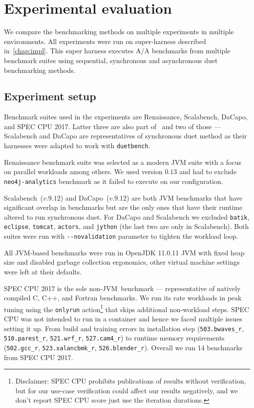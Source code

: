 \chapter{Experimental evaluation}
\label{chap:evaluation}

We compare the benchmarking methods on multiple experiments in multiple environments.
All experiments were run on super-harness described in~\cref{chap:impl}.
This super harness executes A/A benchmarks from multiple benchmark suites using sequential, synchronous and asynchronous duet benchmarking methods.

\section{Experiment setup}
\label{sec:experiment_setup}

Benchmark suites used in the experiments are Renaissance, Scalabench, DaCapo, and SPEC CPU 2017.
Latter three are also part of~\citet{bulej2020duet} and two of those --- Scalabench and DaCapo are representatives of synchronous duet method as their harnesses were adapted to work with \lstinline{duetbench}.

Renaissance benchmark suite was selected as a modern JVM suite with a focus on parallel workloads among others\cite{prokopec2019renaissance}.
We used version $0.13$ and had to exclude \lstinline{neo4j-analytics} benchmark as it failed to execute on our configuration.

Scalabench~($v.9.12$) and DaCapo~($v.9.12$) are both JVM benchmarks that have significant overlap in benchmarks but are the only ones that have their runtime altered to run synchronous duet.
For DaCapo and Scalabench we excluded \lstinline{batik}, \lstinline{eclipse}, \lstinline{tomcat}, \lstinline{actors}, and \lstinline{jython} (the last two are only in Scalabench).
Both suites were run with \lstinline{--novalidation} parameter to tighten the workload loop.

All \mbox{JVM-based} benchmarks were run in OpenJDK 11.0.11 JVM with fixed heap size and disabled garbage collection ergonomics, other virtual machine settings were left at their defaults.

SPEC CPU 2017 is the sole \mbox{non-JVM benchmark} --- representative of natively compiled C, C++, and Fortran benchmarks.
We run its rate workloads in peak tuning using the \lstinline{onlyrun} action\footnote{
	Disclaimer: SPEC CPU prohibits publications of results without verification, but for our use-case verification could affect our results negatively, and we don't report SPEC CPU score just use the iteration durations.}
that skips additional non-workload steps.
SPEC CPU was not intended to run in a container and hence we faced multiple issues setting it up.
From build and training errors in installation step (\lstinline{503.bwaves_r}, \lstinline{510.parest_r}, \lstinline{521.wrf_r}, \lstinline{527.cam4_r}) to runtime memory requirements (\lstinline{502.gcc_r}, \lstinline{523.xalancbmk_r}, \lstinline{526.blender_r}).
Overall we run 14 benchmarks from SPEC CPU 2017.

